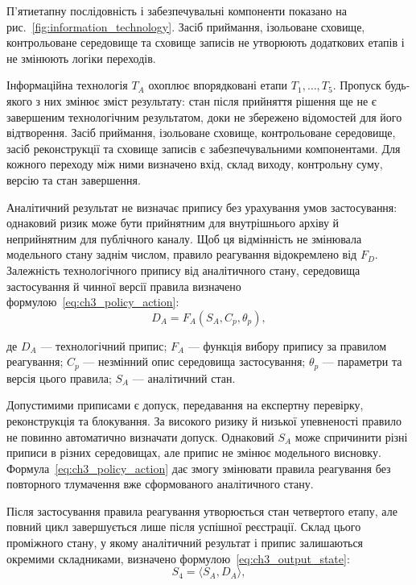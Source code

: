 П’ятиетапну послідовність і забезпечувальні компоненти показано на рис.~\ref{fig:information_technology}. Засіб приймання, ізольоване сховище, контрольоване середовище та сховище записів не утворюють додаткових етапів і не змінюють логіки переходів.



Інформаційна технологія $T_A$ охоплює впорядковані етапи $T_1,\ldots,T_5$. Пропуск будь-якого з них змінює зміст результату: стан після прийняття рішення ще не є завершеним технологічним результатом, доки не збережено відомостей для його відтворення. Засіб приймання, ізольоване сховище, контрольоване середовище, засіб реконструкції та сховище записів є забезпечувальними компонентами. Для кожного переходу між ними визначено вхід, склад виходу, контрольну суму, версію та стан завершення.

Аналітичний результат не визначає припису без урахування умов застосування: однаковий ризик може бути прийнятним для внутрішнього архіву й неприйнятним для публічного каналу. Щоб ця відмінність не змінювала модельного стану заднім числом, правило реагування відокремлено від $F_D$. Залежність технологічного припису від аналітичного стану, середовища застосування й чинної версії правила визначено формулою~\eqref{eq:ch3_policy_action}:
\begin{equation}
D_A=F_A(S_A,C_p,\theta_p),
\label{eq:ch3_policy_action}
\end{equation}

де $D_A$ --- технологічний припис; $F_A$ --- функція вибору припису за правилом реагування; $C_p$ --- незмінний опис середовища застосування; $\theta_p$ --- параметри та версія цього правила; $S_A$ --- аналітичний стан.

Допустимими приписами є допуск, передавання на експертну перевірку, реконструкція та блокування. За високого ризику й низької упевненості правило не повинно автоматично визначати допуск. Однаковий $S_A$ може спричинити різні приписи в різних середовищах, але припис не змінює модельного висновку. Формула~\eqref{eq:ch3_policy_action} дає змогу змінювати правила реагування без повторного тлумачення вже сформованого аналітичного стану.

Після застосування правила реагування утворюється стан четвертого етапу, але повний цикл завершується лише після успішної реєстрації. Склад цього проміжного стану, у якому аналітичний результат і припис залишаються окремими складниками, визначено формулою~\eqref{eq:ch3_output_state}:
\begin{equation}
S_4=\langle S_A,D_A\rangle,
\label{eq:ch3_output_state}
\end{equation}


